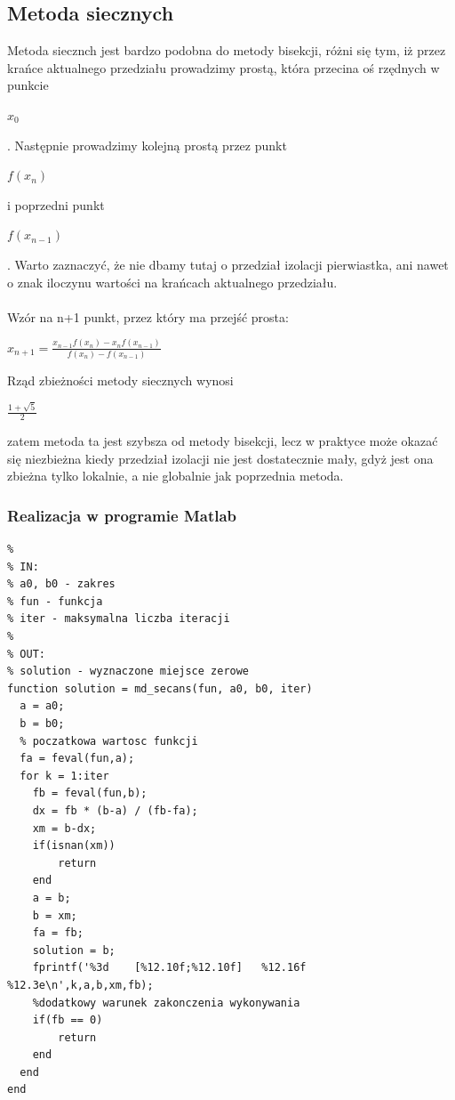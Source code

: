 \documentclass[11pt, oneside]{article}   	%
\begin{document}
\subsection{Metoda siecznych}
Metoda siecznch jest bardzo podobna do metody bisekcji, różni się tym, iż przez krańce aktualnego przedziału prowadzimy prostą, która przecina oś rzędnych w punkcie \begin{large}
$x_{0}$
\end{large}. Następnie prowadzimy kolejną prostą przez punkt \begin{large}
$f(x_{n})$ 
\end{large} i poprzedni punkt \begin{large}
$f(x_{n-1})$ 
\end{large}. Warto zaznaczyć, że nie dbamy tutaj o przedział izolacji pierwiastka, ani nawet o znak iloczynu wartości na krańcach aktualnego przedziału.\\\\
Wzór na n+1 punkt, przez który ma przejść prosta:
\begin{large}
$x_{n+1}=\frac{x_{n-1}f(x_{n})-x_{n}f(x_{n-1})}{f(x_{n})-f(x_{n-1})}$
\end{large}

Rząd zbieżności metody siecznych wynosi \begin{large}$\frac{1+\sqrt{5}}{2}$\end{large} zatem metoda ta jest szybsza od metody bisekcji, lecz w praktyce może okazać się niezbieżna kiedy przedział izolacji nie jest dostatecznie mały, gdyż jest ona zbieżna tylko lokalnie, a nie globalnie jak poprzednia metoda. 
\subsubsection{Realizacja w programie Matlab}
\begin{lstlisting}[caption=Implementacja metody siecznych]
% Funkcja wyznaczajaca punkty zerowe funkcji metoda siecznych
%
% IN:
% a0, b0 - zakres
% fun - funkcja 
% iter - maksymalna liczba iteracji
%
% OUT:
% solution - wyznaczone miejsce zerowe
function solution = md_secans(fun, a0, b0, iter)
  a = a0;
  b = b0;
  % poczatkowa wartosc funkcji
  fa = feval(fun,a); 
  for k = 1:iter
    fb = feval(fun,b);
    dx = fb * (b-a) / (fb-fa); 
    xm = b-dx; 
    if(isnan(xm))
        return
    end
    a = b;
    b = xm;
    fa = fb;
    solution = b;
    fprintf('%3d	[%12.10f;%12.10f]   %12.16f     %12.3e\n',k,a,b,xm,fb);
    %dodatkowy warunek zakonczenia wykonywania
    if(fb == 0) 
        return
    end
  end
end
\end{lstlisting}
\end{document}
